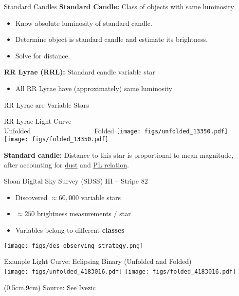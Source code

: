 \documentclass[12pt]{beamer}
\newcommand{\att}[1]{\begin{textblock*}{12cm}(0.5cm,9cm) %
  {\tiny Source: #1}
      \end{textblock*}}
\begin{document}
\begin{frame}{Standard Candles}
  \textbf{Standard Candle:} Class of objects with same luminosity
  \begin{itemize}
  \item Know absolute luminosity of standard candle.
  \item Determine object is standard candle and estimate its brightness.
  \item Solve for distance.
  \end{itemize}

  \vspace{.3in}
  
  \textbf{RR Lyrae (RRL):} Standard candle variable star
  \begin{itemize}
  \item All RR Lyrae have (approximately) same luminosity
  \end{itemize}
\end{frame}

\begin{frame}{RR Lyrae are Variable Stars}

\begin{center}
  RR Lyrae Light Curve\\
  Unfolded \, \, \,   \, \, \,   \, \, \,   \, \, \,   \, \, \,   \, \, \, Folded
\texttt{[image: figs/unfolded\_13350.pdf]}
\texttt{[image: figs/folded\_13350.pdf]}
\end{center}

\begin{center}  
\textbf{Standard candle:} Distance to this star is proportional to mean magnitude, after accounting for \underline{dust} and \underline{PL relation}.
\end{center}

\end{frame}


\begin{frame}{Sloan Digital Sky Survey (SDSS) III -- Stripe 82}
\begin{itemize}
\item Discovered $\approx 60,000$ variable stars
\item $\approx 250$ brightness measurements / star
\item Variables belong to different \textbf{classes}
\end{itemize}


  \begin{center}
    \texttt{[image: figs/des\_observing\_strategy.png]}
    \end{center}


\begin{center}
Example Light Curve: Eclipsing Binary (Unfolded and Folded)\\
\texttt{[image: figs/unfolded\_4183016.pdf]}
\texttt{[image: figs/folded\_4183016.pdf]}
\end{center}

\att{See Ivezic \cite{ivezic2007sloan}}

\end{frame}
\end{document}
